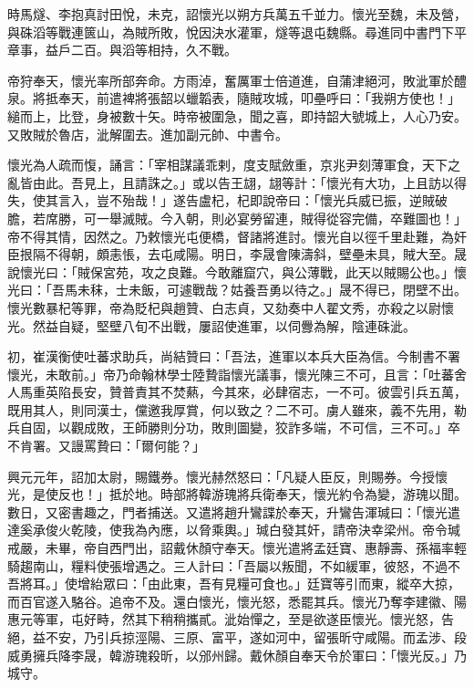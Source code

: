 \begin{pinyinscope}
 時馬燧、李抱真討田悅，未克，詔懷光以朔方兵萬五千並力。懷光至魏，未及營，與硃滔等戰連篋山，為賊所敗，悅因決水灌軍，燧等退屯魏縣。尋進同中書門下平章事，益戶二百。與滔等相持，久不戰。



 帝狩奉天，懷光率所部奔命。方雨淖，奮厲軍士倍道進，自蒲津絕河，敗泚軍於醴泉。將抵奉天，前遣裨將張韶以蠟韜表，隨賊攻城，叩壘呼曰：「我朔方使也！」縋而上，比登，身被數十矢。時帝被圍急，聞之喜，即持韶大號城上，人心乃安。又敗賊於魯店，泚解圍去。進加副元帥、中書令。



 懷光為人疏而愎，誦言：「宰相謀議乖剌，度支賦斂重，京兆尹刻薄軍食，天下之亂皆由此。吾見上，且請誅之。」或以告王翃，翃等計：「懷光有大功，上且訪以得失，使其言入，豈不殆哉！」遂告盧杞，杞即說帝曰：「懷光兵威已振，逆賊破膽，若席勝，可一舉滅賊。今入朝，則必宴勞留連，賊得從容完備，卒難圖也！」帝不得其情，因然之。乃敕懷光屯便橋，督諸將進討。懷光自以徑千里赴難，為奸臣拫隔不得朝，頗恚悵，去屯咸陽。明日，李晟會陳濤斜，壁壘未具，賊大至。晟說懷光曰：「賊保宮苑，攻之良難。今敢離窟穴，與公薄戰，此天以賊賜公也。」懷光曰：「吾馬未秣，士未飯，可遽戰哉？姑養吾勇以待之。」晟不得已，閉壁不出。懷光數暴杞等罪，帝為貶杞與趙贊、白志貞，又劾奏中人翟文秀，亦殺之以尉懷光。然益自疑，堅壁八旬不出戰，屢詔使進軍，以伺釁為解，陰連硃泚。



 初，崔漢衡使吐蕃求助兵，尚結贊曰：「吾法，進軍以本兵大臣為信。今制書不署懷光，未敢前。」帝乃命翰林學士陸贄詣懷光議事，懷光陳三不可，且言：「吐蕃舍人馬重英陷長安，贊普責其不焚爇，今其來，必肆宿志，一不可。彼雲引兵五萬，既用其人，則同漢士，儻邀我厚賞，何以致之？二不可。虜人雖來，義不先用，勒兵自固，以觀成敗，王師勝則分功，敗則圖變，狡詐多端，不可信，三不可。」卒不肯署。又謾罵贄曰：「爾何能？」



 興元元年，詔加太尉，賜鐵券。懷光赫然怒曰：「凡疑人臣反，則賜券。今授懷光，是使反也！」抵於地。時部將韓游瑰將兵衛奉天，懷光約令為變，游瑰以聞。數日，又密書趣之，門者捕送。又遣將趙升鸞諜於奉天，升鸞告渾瑊曰：「懷光遣達奚承俊火乾陵，使我為內應，以脅乘輿。」瑊白發其奸，請帝決幸梁州。帝令瑊戒嚴，未畢，帝自西門出，詔戴休顏守奉天。懷光遣將孟廷寶、惠靜壽、孫福率輕騎趨南山，糧料使張增遇之。三人計曰：「吾屬以叛聞，不如緩軍，彼怒，不過不吾將耳。」使增紿眾曰：「由此東，吾有見糧可食也。」廷寶等引而東，縱卒大掠，而百官遂入駱谷。追帝不及。還白懷光，懷光怒，悉罷其兵。懷光乃奪李建徽、陽惠元等軍，屯好畤，然其下稍稍攜貳。泚始憚之，至是欲遂臣懷光。懷光怒，告絕，益不安，乃引兵掠涇陽、三原、富平，遂如河中，留張昕守咸陽。而孟涉、段威勇擁兵降李晟，韓游瑰殺昕，以邠州歸。戴休顏自奉天令於軍曰：「懷光反。」乃城守。




\end{pinyinscope}
